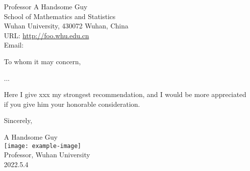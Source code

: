 \documentclass{WHU-Recommendation-Letter}
\begin{document}
\begin{info}
  Professor A Handsome Guy \\
  School of Mathematics and Statistics \\
  Wuhan University, 430072 Wuhan, China \\
  URL: \url{http://foo.whu.edu.cn} \\
  Email:   \\
\end{info}




To whom it may concern,

...

Here I give xxx my strongest recommendation, and I would be more appreciated if you give him your honorable consideration.


Sincerely,


\begin{signature}[direction = right]
  A Handsome Guy \\
  \texttt{[image: example-image]} \\
  Professor, Wuhan University  \\
  2022.5.4
\end{signature}
\end{document}
